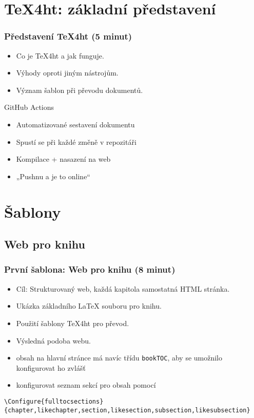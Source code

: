 \documentclass{beamer}
\begin{document}
\section{TeX4ht: základní představení}
\begin{frame}
\frametitle{Představení TeX4ht (5 minut)}
\begin{itemize}
    \item Co je TeX4ht a jak funguje.
    \item Výhody oproti jiným nástrojům.
    \item Význam šablon při převodu dokumentů.
\end{itemize}
\end{frame}

\begin{frame}{GitHub Actions}
\begin{itemize}
  \item Automatizované sestavení dokumentu
  \item Spustí se při každé změně v repozitáři
  \item Kompilace + nasazení na web
  \item „Pushnu a je to online“
\end{itemize}
\end{frame}

\section{Šablony}

\subsection{Web pro knihu}
\begin{frame}
\frametitle{První šablona: Web pro knihu (8 minut)}
\begin{itemize}
    \item Cíl: Strukturovaný web, každá kapitola samostatná HTML stránka.
    \item Ukázka základního LaTeX souboru pro knihu.
    \item Použití šablony TeX4ht pro převod.
    \item Výsledná podoba webu.
\end{itemize}
\end{frame}

\begin{frame}[fragile]
\begin{itemize}
  \item obsah na hlavní stránce má navíc třídu \verb|bookTOC|, aby se umožnilo konfigurovat ho zvlášť
  \item konfigurovat seznam sekcí pro obsah pomocí 
\end{itemize}
\begin{verbatim}
\Configure{fulltocsections}{chapter,likechapter,section,likesection,subsection,likesubsection}
\end{verbatim}
\end{frame}
\end{document}
